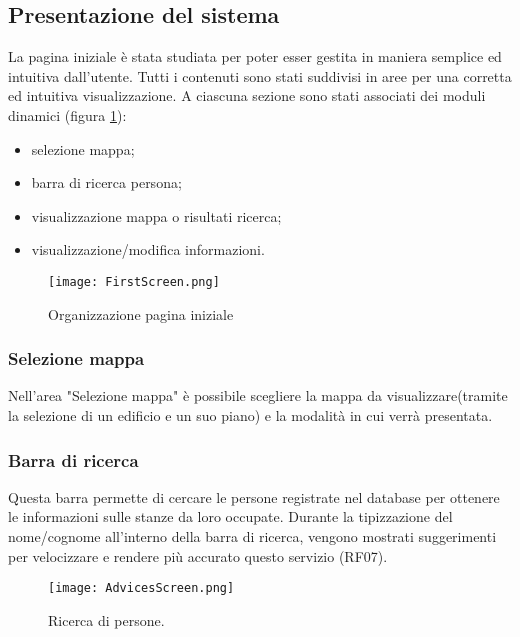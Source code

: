 \FloatBarrier
\subsection{Presentazione del sistema}
La pagina iniziale è stata studiata per poter esser gestita in maniera semplice ed intuitiva dall'utente.  Tutti i contenuti sono stati suddivisi in aree  per  una  corretta  ed  intuitiva  visualizzazione. 
A  ciascuna sezione   sono   stati associati dei moduli dinamici (figura \ref{Screen:first}):

\begin{itemize}
\item selezione mappa;
\item barra di ricerca persona;
\item visualizzazione mappa o risultati ricerca;
\item visualizzazione/modifica informazioni.
\end{itemize}

\begin{figure}[!htb]
\centering%
\texttt{[image: FirstScreen.png]}%
\caption{Organizzazione pagina iniziale}\label{Screen:first}%
\end{figure}

\FloatBarrier
\subsubsection*{Selezione mappa}
Nell'area "Selezione mappa" è possibile scegliere la mappa da visualizzare(tramite la selezione di un edificio e un suo piano) e la modalità in cui verrà presentata.

\subsubsection*{Barra di ricerca}
Questa barra permette di cercare le persone registrate nel database per ottenere le informazioni sulle stanze da loro occupate. Durante la tipizzazione del nome/cognome all'interno della barra di ricerca, vengono mostrati suggerimenti per velocizzare e rendere più accurato questo servizio (RF07).

\begin{figure}[!htb]
\centering%
\texttt{[image: AdvicesScreen.png]}%
\caption{Ricerca di persone.}\label{Screen:advices}%
\end{figure}
\FloatBarrier

